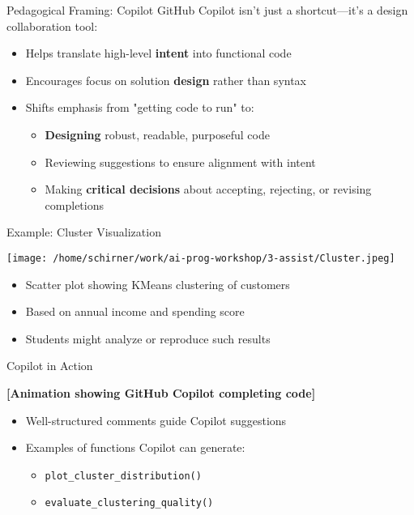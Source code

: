 \documentclass[xcolor={dvipsnames}, aspectratio=169]{beamer}
\begin{document}
\begin{frame}{Pedagogical Framing: Copilot}
  GitHub Copilot isn't just a shortcut—it's a design collaboration tool:
  \begin{itemize}
    \item Helps translate high-level \textbf{intent} into functional code
    \item Encourages focus on solution \textbf{design} rather than syntax
    \item Shifts emphasis from "getting code to run" to:
      \begin{itemize}
        \item \textbf{Designing} robust, readable, purposeful code
        \item Reviewing suggestions to ensure alignment with intent
        \item Making \textbf{critical decisions} about accepting, rejecting, or revising completions
      \end{itemize}
  \end{itemize}
\end{frame}

\begin{frame}{Example: Cluster Visualization}
  \begin{center}
    \texttt{[image: /home/schirner/work/ai-prog-workshop/3-assist/Cluster.jpeg]}
  \end{center}
  \begin{itemize}
    \item Scatter plot showing KMeans clustering of customers
    \item Based on annual income and spending score
    \item Students might analyze or reproduce such results
  \end{itemize}
\end{frame}

\begin{frame}{Copilot in Action}
  \begin{center}
    \textbf{[Animation showing GitHub Copilot completing code]}
  \end{center}
  \begin{itemize}
    \item Well-structured comments guide Copilot suggestions
    \item Examples of functions Copilot can generate:
      \begin{itemize}
        \item \texttt{plot\_cluster\_distribution()}
        \item \texttt{evaluate\_clustering\_quality()}
      \end{itemize}
  \end{itemize}
\end{frame}
\end{document}
